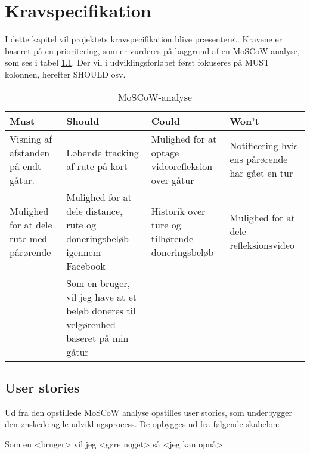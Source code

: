\thispagestyle{fancy}
\chapter{Kravspecifikation}
\label{chp:kravspec}

I dette kapitel vil projektets kravspecifikation blive præsenteret. Kravene er baseret på en prioritering, som er vurderes på baggrund af en MoSCoW analyse, som ses i tabel \ref{tab:MosCoW}. Der vil i udviklingsforløbet først fokuseres på MUST kolonnen, herefter SHOULD osv. 

\begin{table}[h]
\begin{tabular}{|>{\rr}p{3.2cm}|>{\rr}p{3.2cm}|>{\rr}p{3.2cm}|p{3.2cm}|} 
\hline
\rowcolor{ThemeColor!80}  
\rowcolor{ThemeColor!80} \vspace{0.2cm}  \textbf{Must} \newline & \vspace{0.2cm}  \textbf{Should} & \vspace{0.2cm}  \textbf{Could} &  \vspace{0.2cm} \textbf{Won't} \\ 
\hline
 Visning af afstanden på endt gåtur.   & Løbende tracking af rute på kort & Mulighed for at optage videorefleksion over gåtur & Notificering hvis ens pårørende har gået en tur \vspace{1cm} \\
\hline 
Mulighed for at dele rute med pårørende & Mulighed for at dele distance, rute og doneringsbeløb igennem Facebook &  Historik over ture og tilhørende doneringsbeløb & Mulighed for at dele refleksionsvideo  \vspace{1cm} \\
\hline
 & Som en bruger, vil jeg have at et beløb doneres til velgørenhed baseret på min gåtur &  &  \\
\hline
\end{tabular}
\caption{MoSCoW-analyse}
\label{tab:MosCoW}
\end{table}
\FloatBarrier


\section{User stories}
Ud fra den opstillede MoSCoW analyse opstilles user stories, som underbygger den ønskede agile udviklingsprocess.
De opbygges ud fra følgende skabelon: \\

\centerline{Som en <bruger> vil jeg <gøre noget> så <jeg kan opnå>}  \hfill

